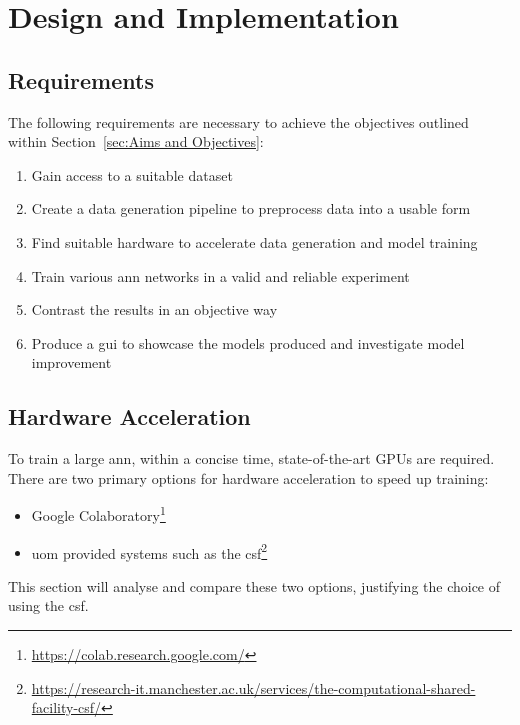 \chapter{Design and Implementation}
\label{cha:design}
\graphicspath{ {./resources/} }

\section{Requirements}
The following requirements are necessary to achieve the objectives outlined within Section~\ref{sec:Aims and Objectives}:
\begin{enumerate}
  \item Gain access to a suitable dataset
  \item Create a data generation pipeline to preprocess data into a usable form
  \item Find suitable hardware to accelerate data generation and model training
  \item Train various \acrshort{ann} networks in a valid and reliable experiment
  \item Contrast the results in an objective way
  \item Produce a \acrshort{gui} to showcase the models produced and investigate model improvement
\end{enumerate}
\section{Hardware Acceleration}
To train a large \acrshort{ann}, within a concise time, state-of-the-art GPUs are required. There are two primary options for hardware acceleration to speed up training:
\begin{itemize}
    \item Google Colaboratory\footnote{\url{https://colab.research.google.com/}}
    \item \acrfull{uom} provided systems such as the \acrshort{csf}\footnote{\url{https://research-it.manchester.ac.uk/services/the-computational-shared-facility-csf/}}
\end{itemize}
This section will analyse and compare these two options, justifying the choice of using the \acrshort{csf}.
